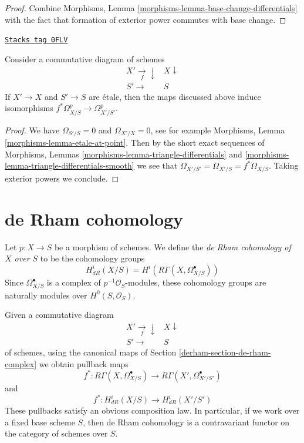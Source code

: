 \begin{proof}
Combine Morphisms, Lemma \ref{morphisms-lemma-base-change-differentials}
with the fact that formation of exterior power commutes with base change.
\end{proof}

\begin{lemma}[Etale]
\label{derham-lemma-etale}
\href{https://stacks.math.columbia.edu/tag/0FLV}{\texttt{Stacks tag 0FLV}}

Consider a commutative diagram of schemes
$$
\begin{array}{cc}X' \underset{f}{\longrightarrow}\downarrow & X \downarrow \\ S' \longrightarrow & S\end{array}
$$
If $X' \to X$ and $S' \to S$ are \'etale, then the maps discussed
above induce isomorphisms
$f^*\Omega^p_{X/S} \to \Omega^p_{X'/S'}$.
\end{lemma}

\begin{proof}
We have $\Omega_{S'/S} = 0$ and $\Omega_{X'/X} = 0$, see for example
Morphisms, Lemma \ref{morphisms-lemma-etale-at-point}. Then by
the short exact sequences of Morphisms, Lemmas
\ref{morphisms-lemma-triangle-differentials} and
\ref{morphisms-lemma-triangle-differentials-smooth}
we see that $\Omega_{X'/S'} = \Omega_{X'/S} = f^*\Omega_{X/S}$.
Taking exterior powers we conclude.
\end{proof}

\section{de Rham cohomology}
\label{derham-section-de-rham-cohomology}
Let $p : X \to S$ be a morphism of schemes. We define the
{\it de Rham cohomology of $X$ over $S$} to be the cohomology
groups
$$
H^i_{dR}(X/S) = H^i(R\Gamma(X, \Omega^\bullet_{X/S}))
$$
Since $\Omega^\bullet_{X/S}$ is a complex of $p^{-1}\mathcal{O}_S$-modules,
these cohomology groups are naturally modules over $H^0(S, \mathcal{O}_S)$.

\medskip\noindent
Given a commutative diagram
$$
\begin{array}{cc}X' \underset{f}{\longrightarrow}\downarrow & X \downarrow \\ S' \longrightarrow & S\end{array}
$$
of schemes, using the canonical maps of Section \ref{derham-section-de-rham-complex}
we obtain pullback maps
$$
f^* :
R\Gamma(X, \Omega^\bullet_{X/S})
\longrightarrow
R\Gamma(X', \Omega^\bullet_{X'/S'})
$$
and
$$
f^* : H^i_{dR}(X/S) \longrightarrow H^i_{dR}(X'/S')
$$
These pullbacks satisfy an obvious composition law.
In particular, if we work over a fixed base scheme $S$, then de Rham
cohomology is a contravariant functor on the category of schemes over $S$.

